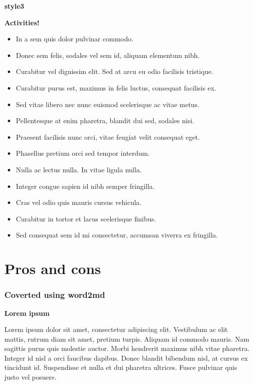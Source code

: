 \documentclass[
]{book}
\begin{document}
\textbf{style3}

\textbf{Activities!}

\begin{itemize}
\item
  In a sem quis dolor pulvinar commodo.
\item
  Donec sem felis, sodales vel sem id, aliquam elementum nibh.
\item
  Curabitur vel dignissim elit. Sed at arcu eu odio facilisis tristique.
\item
  Curabitur purus est, maximus in felis luctus, consequat facilisis ex.
\item
  Sed vitae libero nec nunc euismod scelerisque ac vitae metus.
\item
  Pellentesque at enim pharetra, blandit dui sed, sodales nisi.
\item
  Praesent facilisis nunc orci, vitae feugiat velit consequat eget.
\item
  Phasellus pretium orci sed tempor interdum.
\item
  Nulla ac lectus nulla. In vitae ligula nulla.
\item
  Integer congue sapien id nibh semper fringilla.
\item
  Cras vel odio quis mauris cursus vehicula.
\item
  Curabitur in tortor et lacus scelerisque finibus.
\item
  Sed consequat sem id mi consectetur, accumsan viverra ex fringilla.
\end{itemize}

\hypertarget{pros-and-cons}{%
\chapter{Pros and cons}\label{pros-and-cons}}

\hypertarget{coverted-using-word2md}{%
\subsection{Coverted using word2md}\label{coverted-using-word2md}}

\textbf{Lorem ipsum}

Lorem ipsum dolor sit amet, consectetur adipiscing elit. Vestibulum ac elit mattis, rutrum diam sit amet, pretium turpis. Aliquam id commodo mauris. Nam sagittis purus quis molestie auctor. Morbi hendrerit maximus nibh vitae pharetra. Integer id nisl a orci faucibus dapibus. Donec blandit bibendum nisl, at cursus ex tincidunt id. Suspendisse et nulla et dui pharetra ultrices. Fusce pulvinar quis justo vel posuere.
\end{document}
